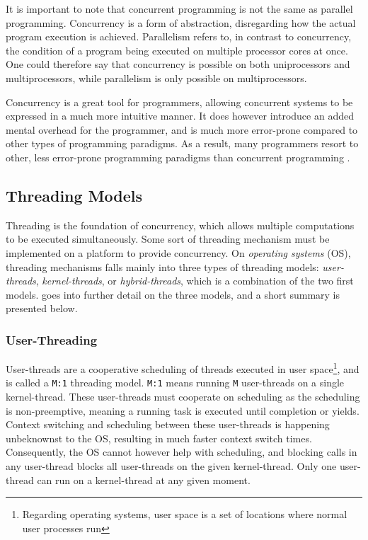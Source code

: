It is important to note that concurrent programming is not the same as parallel programming. Concurrency is a form of abstraction, disregarding how the actual program execution is achieved. Parallelism refers to, in contrast to concurrency, the condition of a program being executed on multiple processor cores at once. One could therefore say that concurrency is possible on both uniprocessors and multiprocessors, while parallelism is only possible on multiprocessors.

Concurrency is a great tool for programmers, allowing concurrent systems to be expressed in a much more intuitive manner. It does however introduce an added mental overhead for the programmer, and is much more error\hyp{}prone compared to other types of programming paradigms. As a result, many programmers resort to other, less error\hyp{}prone programming paradigms than concurrent programming \citep{mordechai2006principles}.


\subsection{Threading Models}
\label{subsec:threading_models}


Threading is the foundation of concurrency, which allows multiple computations to be executed simultaneously. Some sort of threading mechanism must be implemented on a platform to provide concurrency. On \textit{operating systems} (OS), threading mechanisms falls mainly into three types of threading models: \textit{user\hyp{}threads}, \textit{kernel\hyp{}threads}, or \textit{hybrid\hyp{}threads}, which is a combination of the two first models. \citet[sec. 1]{brown2007c++csp2} goes into further detail on the three models, and a short summary is presented below.


\subsubsection{User\hyp{}Threading}


User\hyp{}threads are a cooperative scheduling of threads executed in user space\footnote{Regarding operating systems, user space is a set of locations where normal user processes run}, and is called a \texttt{M:1} threading model. \texttt{M:1} means running \texttt{M} user\hyp{}threads on a single kernel\hyp{}thread. These user\hyp{}threads must cooperate on scheduling as the scheduling is non\hyp{}preemptive, meaning a running task is executed until completion or yields. Context switching and scheduling between these user\hyp{}threads is happening unbeknownst to the OS, resulting in much faster context switch times. Consequently, the OS cannot however help with scheduling, and blocking calls in any user\hyp{}thread blocks all user\hyp{}threads on the given kernel\hyp{}thread. Only one user\hyp{}thread can run on a kernel\hyp{}thread at any given moment.



